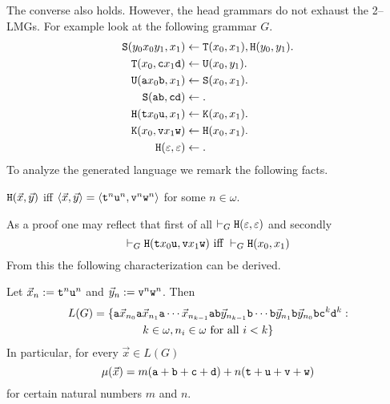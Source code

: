 The converse also holds. However, the head grammars do not exhaust 
the 2--LMGs. For example look at the following grammar $G$.
\begin{align}
\notag
\mbox{\tt S}(y_0x_0y_1,x_1) & \leftarrow \mbox{\tt T}(x_0,x_1),
    \mbox{\tt H}(y_0,y_1). \\
\notag
\mbox{\tt T}(x_0, \mbox{\tt c}x_1\mbox{\tt d}) & \leftarrow
    \mbox{\tt U}(x_0,y_1). \\
\notag
\mbox{\tt U}(\mbox{\tt a}x_0\mbox{\tt b}, x_1) & \leftarrow
    \mbox{\tt S}(x_0,x_1). \\
\mbox{\tt S}(\mbox{\tt ab}, \mbox{\tt cd}) & \leftarrow . \\
\notag
\mbox{\tt H}(\mbox{\tt t}x_0\mbox{\tt u}, x_1) & \leftarrow
    \mbox{\tt K}(x_0, x_1). \\
\notag
\mbox{\tt K}(x_0, \mbox{\tt v}x_1\mbox{\tt w}) & \leftarrow
    \mbox{\tt H}(x_0,x_1). \\
\notag
\mbox{\tt H}(\varepsilon, \varepsilon) & \leftarrow.
\end{align}
To analyze the generated language we remark the following facts.
\begin{lem}
$\mbox{\tt H}(\vec{x}, \vec{y})$ iff
$\langle \vec{x}, \vec{y}\rangle = \langle \mbox{\tt t}^n\mbox{\tt u}^n,
\mbox{\tt v}^n\mbox{\tt w}^n\rangle$ for some $n \in \omega$.
\end{lem}
As a proof one may reflect that first of all $\vdash_G
\mbox{\tt H}(\varepsilon, \varepsilon)$ and secondly
\begin{equation}
\vdash_G \mbox{\tt H}(\mbox{\tt t}x_0\mbox{\tt u},
    \mbox{\tt v}x_1\mbox{\tt w}) \mbox{ iff }
    \vdash_G \mbox{\tt H}(x_0, x_1)
\end{equation}
From this the following characterization can be derived.
\begin{lem}
Let $\vec{x}_n := \mbox{\tt t}^n\mbox{\tt u}^n$ and
$\vec{y}_n := \mbox{\tt v}^n\mbox{\tt w}^n$. Then
\begin{multline}
L(G) = \{\mbox{\tt a}\vec{x}_{n_0}\mbox{\tt a}\vec{x}_{n_1}
    \mbox{\tt a}\dotsb\vec{x}_{n_{k-1}}\mbox{\tt ab}
    \vec{y}_{n_{k-1}}\mbox{\tt b}\dotsb\mbox{\tt b}
    \vec{y}_{n_1}\mbox{\tt b}\vec{y}_{n_0}\mbox{\tt bc}^k
    \mbox{\tt d}^k : \\
k \in \omega, n_i \in \omega \text{ for all }i < k\}
\end{multline}
In particular, for every $\vec{x} \in L(G)$
\begin{equation}
\mu(\vec{x}) = m(\mbox{\tt a} + \mbox{\tt b} + \mbox{\tt c}
      + \mbox{\tt d}) + n(\mbox{\tt t} + \mbox{\tt u} +
        \mbox{\tt v} + \mbox{\tt w})
\end{equation}
for certain natural numbers $m$ and $n$.
\end{lem}
